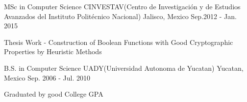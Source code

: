 


\begin{cventries}


\cventry
{MSc in Computer Science} %
{CINVESTAV(Centro de Investigación y de Estudios Avanzados del Instituto Politécnico Nacional)} %
{Jalisco, Mexico} %
{Sep.2012 - Jan. 2015} %
{ %
\begin{cvitems}
\item {Thesis Work - Construction of Boolean Functions with Good Cryptographic Properties by Heuristic Methods}
\end{cvitems}
}

\cventry
{B.S. in Computer Science} %
{UADY(Universidad Autonoma de Yucatan)} %
{Yucatan, Mexico} %
{Sep. 2006 -  Jul. 2010} %
{ %
\begin{cvitems}
\item {Graduated by good College GPA}
\end{cvitems}
}


\end{cventries}